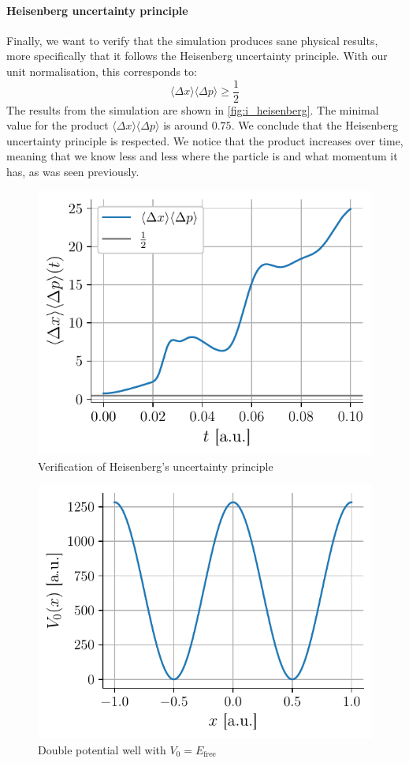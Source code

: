 \paragraph{Heisenberg uncertainty principle} Finally, we want to verify that the simulation produces sane physical results, more specifically that it follows the Heisenberg uncertainty principle. With our unit normalisation, this corresponds to:
\begin{equation}
    \langle \Delta x \rangle \langle \Delta p \rangle \ge \frac{1}{2}
\end{equation}
The results from the simulation are shown in \autoref{fig:i_heisenberg}. The minimal value for the product \(\langle \Delta x \rangle \langle \Delta p \rangle\) is around \(0.75\). We conclude that the Heisenberg uncertainty principle is respected. We notice that the product increases over time, meaning that we know less and less where the particle is and what momentum it has, as was seen previously.
\begin{figure}[H]
    \centering
    \includegraphics[width=0.45\linewidth]{figures/i_heisenberg.pdf}
    \caption{Verification of Heisenberg's uncertainty principle}
    \label{fig:i_heisenberg}
\end{figure}

\begin{figure}
    \includegraphics[width=\linewidth]{figures/potential.pdf}
    \caption{Double potential well with \mbox{$V_0 = E_\mathrm{free}$}}
    \label{fig:potential}
    \vspace*{-1cm}
\end{figure}
